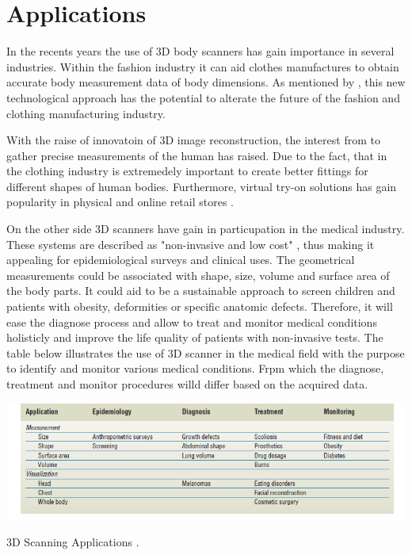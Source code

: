 \documentclass[12pt]{report}
\begin{document}
\section{Applications}
In the recents years the use of 3D body scanners has gain importance in several industries. Within the fashion industry it can aid clothes manufactures to obtain accurate body measurement data of body dimensions.
As mentioned by \citet*{sturm_bylow_kahl_cremers_2013}, this new technological approach has the potential to alterate the future of the fashion and clothing manufacturing industry.

With the raise of innovatoin of 3D image reconstruction, the interest from to gather precise measurements of the human has raised. Due to the fact, that in the clothing industry
is extremedely important to create better fittings for different shapes of human bodies. 
Furthermore, virtual try-on solutions has gain popularity in physical and online retail stores .

On the other side 3D scanners have gain in particupation in the medical industry. These systems are described as "non-invasive and low cost" , thus making it appealing for epidemiological surveys and clinical uses. 
The geometrical measurements could be associated with shape, size, volume and surface area of the body parts. It could aid to be a sustainable approach to screen children and patients with obesity, deformities or specific anatomic defects. 
Therefore, it will ease the diagnose process and allow to treat and monitor medical conditions holisticly and improve the life quality of patients with non-invasive tests.
The table below illustrates the use of 3D scanner in the medical field with the purpose to identify and monitor various medical conditions. 
Frpm which the diagnose, treatment and monitor procedures willd differ based on the acquired data.
\begin{table}[ht]
    \centering
    \includegraphics[width=15cm]{table1.png}
    \caption{3D Scanning Applications \cite[]{treleaven_wells_2007}.}
\end{table}
\end{document}
